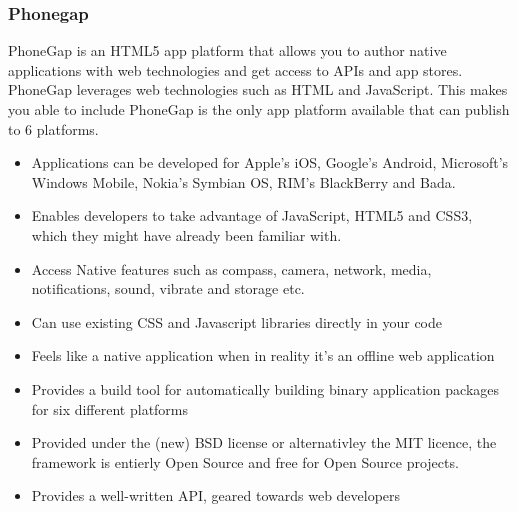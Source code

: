 \subsubsection{Phonegap}
PhoneGap is an HTML5 app platform that allows you to author native applications with web technologies and get access to APIs and app stores. PhoneGap leverages web technologies such as HTML and JavaScript. This makes you able to include PhoneGap is the only app platform available that can publish to 6 platforms. 
\cite{phonegap:about}
	\begin{itemize}
		\item Applications can be developed for Apple’s iOS, Google’s Android,
		Microsoft’s Windows Mobile, Nokia’s Symbian OS, RIM’s BlackBerry and Bada.
		\item Enables developers to take advantage of JavaScript, HTML5 and CSS3,
		which they might have already been familiar with.
		\item Access Native features such as compass, camera, network, media,
		notifications, sound, vibrate and storage etc.
    \item Can use existing CSS and Javascript libraries directly in your code
    \item Feels like a native application when in reality it's an offline web application
    \item Provides a build tool for automatically building binary application packages for six different platforms
    \item Provided under the (new) BSD license or alternativley the MIT licence, the framework is entierly Open Source and free for Open Source projects.
    \item Provides a well-written API, geared towards web developers
	\end{itemize}
